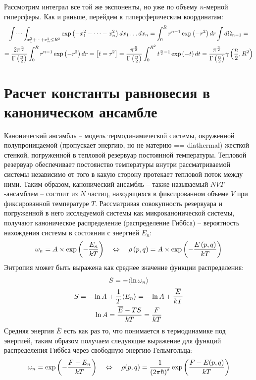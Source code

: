 \documentclass[14pt]{article}
\newcommand{\lb}{\left(}
\newcommand{\rb}{\right)}
\begin{document}
Рассмотрим интеграл все той же экспоненты, но уже по объему $n$-мерной гиперсферы. Как и раньше, перейдем к гиперсферическим координатам:
\begin{gather}
	\int \dots \int_{x_1^2 + \dots + x_n^2 \leq R^2} \exp \lb -x_1^2 - \dots - x_n^2 \rb dx_1 \dots dx_n = \int_{0}^{R} r^{n-1} \exp \lb -r^2 \rb dr \int d \Omega_{n-1} = \notag \\
	= \frac{2 \pi^{\frac{n}{2}}}{\Gamma \lb \frac{n}{2} \rb} \int_{0}^{R} r^{n-1} \exp \lb -r^2 \rb dr = \left[ t = r^2 \right] = \frac{\pi^{\frac{n}{2}}}{\Gamma \lb \frac{n}{2} \rb} \int_{0}^{R^2} t^{\frac{n}{2} - 1} \exp \lb -t \rb dt = \frac{\pi^{\frac{n}{2}}}{\Gamma \lb \frac{n}{2} \rb} \gamma \lb \frac{n}{2}, R^2 \rb \notag
\end{gather}

\newpage

\section*{Расчет константы равновесия в каноническом ансамбле}

Канонический ансамбль -- модель термодинамической системы, окруженной полупроницаемой (пропускает энергию, но не материю == diathermal) жесткой стенкой, погруженной в тепловой резервуар постоянной температуры. Тепловой резервуар обеспечивает постоянство температуры внутри рассматриваемой системы независимо от того в какую сторону протекает тепловой поток между ними. Таким образом, канонический ансамбль -- также называемый $NVT$-ансамблем -- состоит из $N$ частиц, находящихся в фиксированном объеме $V$ при фиксированной температуре $T$.  Рассматривая совокупность резервуара и погруженной в него исследуемой системы как микроканонической системы, получают каноническое распределение (распределение Гиббса) -- вероятность нахождения системы в состоянии с энергией $E_n$:
\begin{gather}
	\omega_n = A \times \exp \lb - \frac{E_n}{kT} \rb \quad \Leftrightarrow \quad \rho \lb p, q \rb = A \times \exp \lb - \frac{E \lb p, q \rb}{kT} \rb \notag
\end{gather}
Энтропия может быть выражена как среднее значение функции распределения:
\begin{gather}
	S = - \langle \ln \omega_n \rangle \notag \\
	S = - \ln A + \frac{1}{T} \langle E_n \rangle = - \ln A + \frac{\overline{E}}{kT} \notag \\
	\ln A = \frac{\overline{E} - TS}{kT} = \frac{F}{kT} \notag 
\end{gather}
Средняя энергия $\overline{E}$ есть как раз то, что понимается в термодинамике под энергией, таким образом получаем следующие выражение для функций распределения Гиббса через свободную энергию Гельмгольца:
\begin{gather}
	\omega_n = \exp \lb - \frac{F - E_n}{kT} \rb \quad \Leftrightarrow \quad \rho(p, q) = \frac{1}{\lb 2 \pi \hbar \rb^{s}} \exp \lb \frac{F - E(p, q)}{kT} \rb \notag
\end{gather}
\end{document}
